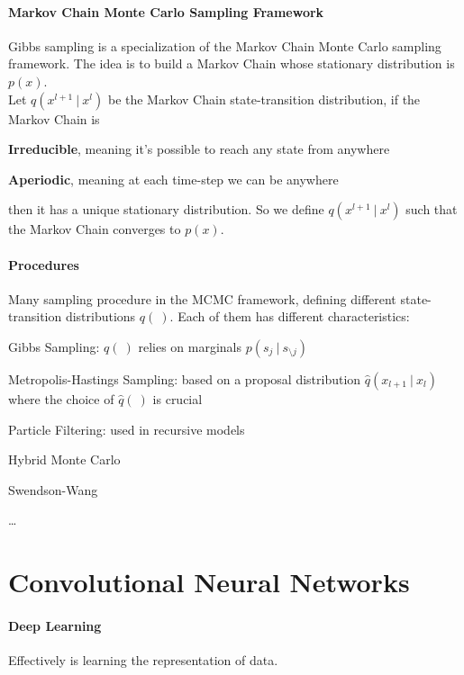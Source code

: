 \documentclass[10pt]{report}
\begin{document}
\paragraph{Markov Chain Monte Carlo Sampling Framework} Gibbs sampling is a specialization of the Markov Chain Monte Carlo sampling framework. The idea is to build a Markov Chain whose stationary distribution is $p(x)$.\\
Let $q(x^{l+1}\:|\:x^l)$ be the Markov Chain state-transition distribution, if the Markov Chain is\begin{list}{}{}
	\item \textbf{Irreducible}, meaning it's possible to reach any state from anywhere
	\item \textbf{Aperiodic}, meaning at each time-step we can be anywhere
\end{list}
then it has a unique stationary distribution. So we define $q(x^{l+1}\:|\:x^l)$ such that the Markov Chain converges to $p(x)$.
\paragraph{Procedures} Many sampling procedure in the MCMC framework, defining different state-transition distributions $q(\:)$. Each of them has different characteristics:
\begin{list}{}{}
	\item Gibbs Sampling: $q(\:)$ relies on marginals $p(s_j\:|\:s_{\setminus j})$
	\item Metropolis-Hastings Sampling: based on a proposal distribution $\hat{q}(x_{l+1}\:|\:x_l)$ where the choice of $\hat{q}(\:)$ is crucial
	\item Particle Filtering: used in recursive models
	\item Hybrid Monte Carlo
	\item Swendson-Wang
	\item \ldots
\end{list}
\section{Convolutional Neural Networks}
\paragraph{Deep Learning} Effectively is learning the representation of data.
\end{document}
